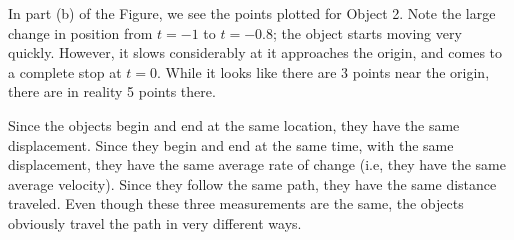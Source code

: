{In part (b) of the Figure, we see the points plotted for Object 2. Note the large change in position from $t=-1$ to $t=-0.8$; the object starts moving very quickly. However, it slows considerably at it approaches the origin, and comes to a complete stop at $t=0$. While it looks like there are 3 points near the origin, there are in reality 5 points there.

Since the objects begin and end at the same location, they have the same displacement. Since they begin and end at the same time, with the same displacement, they have the same average rate of change (i.e, they have the same average velocity). Since they follow the same path, they have the same distance traveled. Even though these three measurements are the same, the objects obviously travel the path in very different ways.}

